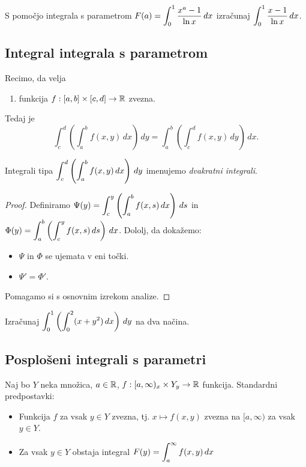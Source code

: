 \begin{zgled}
    S pomočjo integrala s parametrom $\displaystyle F(a) = \int_{0}^{1} \frac{x^a-1}{\ln x} \,dx $ izračunaj $\displaystyle \int_{0}^{1} \frac{x-1}{\ln x} \,dx $.
\end{zgled}

\subsection{Integral integrala s parametrom}
\begin{izrek}
    Recimo, da velja
    \begin{enumerate}
        \item funkcija \(f:[a,b] \times [c,d] \to \mathbb{R}\) zvezna.
    \end{enumerate}
    Tedaj je 
    $$\int_{c}^{d} \left(\int_{a}^{b} f(x,y) \,dx \right) \,dy =  \int_{a}^{b} \left(\int_{c}^{d} f(x,y) \,dy \right) \,dx.$$
\end{izrek}

\begin{definicija}
    Integrali tipa $\displaystyle \int_{c}^{d} \left(\int_{a}^{b} f(x,y) \,dx \right) \,dy$ imenujemo \emph{dvakratni integrali}. 
\end{definicija}

\begin{proof}
    Definiramo $\displaystyle \Psi(y) = \int_{c}^{y} \left(\int_{a}^{b} f(x,s) \,dx \right) \,ds $ in $\displaystyle \Phi(y) = \int_{a}^{b} \left(\int_{c}^{y} f(x,s) \,ds \right) \,dx$. Dololj, da dokažemo:
    \begin{itemize}
        \item $\Psi$ in $\Phi$ se ujemata v eni točki.
        \item $\Psi' = \Phi'$.
    \end{itemize}
    Pomagamo si s osnovnim izrekom analize.
\end{proof}

\begin{zgled}
    Izračunaj $\displaystyle \int_{0}^{1} \left(\int_{0}^{2} (x + y^2)  \,dx \right)  \,dy $ na dva načina.
\end{zgled}

\subsection{Posplošeni integrali s parametri}
Naj bo $Y$ neka množica, $a \in \mathbb{R}$, $f: [a, \infty)_x \times Y_y \to \mathbb{R}$ funkcija. Standardni predpostavki:
\begin{itemize}
    \item Funkcija $f$ za vsak $y \in Y$ zvezna, tj. $x \mapsto f(x,y)$ zvezna na $[a, \infty)$ za vsak \(y \in Y\).
    \item Za vsak \(y \in Y\) obstaja integral \( \displaystyle F(y)= \int_{a}^{\infty} f(x,y) \,dx \)
\end{itemize}

